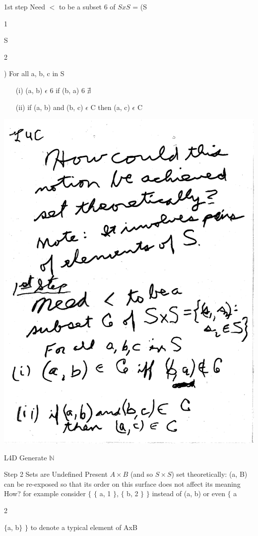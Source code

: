 \documentclass[10pt,a4paper]{article}
\begin{document}
1st step 
Need $<$ to be a subset 6 of $SxS$ = (S{\begin{tiny}
1 
\end{tiny}
S{\begin{tiny}
2
\end{tiny})
For all a, b, c in S
\begin{enumerate}
\item[(i)] 
(a, b) $\epsilon$ 6 
if (b, a) 6 $\nexists$ 
\item[(ii)] 
if (a, b) and (b, c) $\epsilon$ C then (a, c) $\epsilon$ C
\end{enumerate}

\includegraphics[scale=0.5]{Pages/generateN3.pdf}

\newpage

\begin{Large}
L4D Generate $\mathbb{N}$
\end{Large}

Step 2 Sets are Undefined Present $A \times B$ (and so $S \times S$) set theoretically: (a, B) can be re-exposed so that its order on this surface does not affect its meaning How? for example consider $\lbrace$ $\lbrace$ a, 1 $\rbrace$, $\lbrace$ b, 2 $\rbrace$
$\rbrace$ instead of (a, b) or even $\lbrace$ a\begin{tiny}
2
\end{tiny}
$\lbrace$a, b$\rbrace$
$\rbrace$ to denote a typical element of AxB

}}
\end{document}
